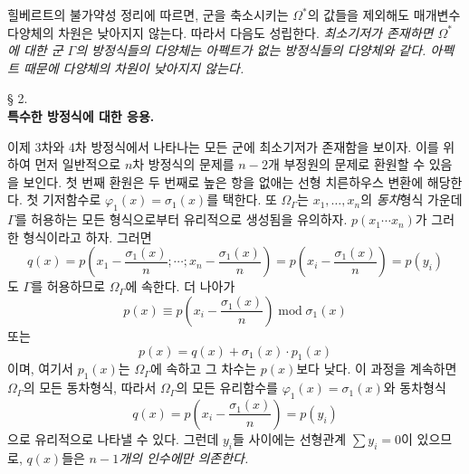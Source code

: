 힐베르트의 불가약성 정리에 따르면, 군을 축소시키는 \(\Omega^*\)의 값들을 제외해도 매개변수다양체의 차원은 낮아지지 않는다. 따라서 다음도 성립한다. \emph{최소기저가 존재하면 \(\Omega^*\)에 대한 군 \(\Gamma\)의 방정식들의 다양체는 아펙트가 없는 방정식들의 다양체와 같다. 아펙트 때문에 다양체의 차원이 낮아지지 않는다.}

\begin{center}
§ 2.\\[0.75em]
\textbf{특수한 방정식에 대한 응용.}
\end{center}

이제 3차와 4차 방정식에서 나타나는 모든 군에 최소기저가 존재함을 보이자. 이를 위하여 먼저 일반적으로 \(n\)차 방정식의 문제를 \(n-2\)개 부정원의 문제로 환원할 수 있음을 보인다. 첫 번째 환원은 두 번째로 높은 항을 없애는 선형 치른하우스 변환에 해당한다. 첫 기저함수로 \(\varphi_1(x)=\sigma_1(x)\)를 택한다. 또 \(\Omega_\Gamma\)는 \(x_1,\ldots,x_n\)의 \emph{동차}형식 가운데 \(\Gamma\)를 허용하는 모든 형식으로부터 유리적으로 생성됨을 유의하자. \(p(x_1\cdots x_n)\)가 그러한 형식이라고 하자. 그러면
\[
q(x)=p\left(x_1-\frac{\sigma_1(x)}{n};\cdots;x_n-\frac{\sigma_1(x)}{n}\right)=p\left(x_i-\frac{\sigma_1(x)}{n}\right)=p(y_i)
\]
도 \(\Gamma\)를 허용하므로 \(\Omega_\Gamma\)에 속한다. 더 나아가
\[
p(x)\equiv p\left(x_i-\frac{\sigma_1(x)}{n}\right)\operatorname{mod}\sigma_1(x)
\]
또는
\[
p(x)=q(x)+\sigma_1(x)\cdot p_1(x)
\]
이며, 여기서 \(p_1(x)\)는 \(\Omega_\Gamma\)에 속하고 그 차수는 \(p(x)\)보다 낮다. 이 과정을 계속하면 \(\Omega_\Gamma\)의 모든 동차형식, 따라서 \(\Omega_\Gamma\)의 모든 유리함수를 \(\varphi_1(x)=\sigma_1(x)\)와 동차형식
\[
q(x)=p\left(x_i-\frac{\sigma_1(x)}{n}\right)=p(y_i)
\]
으로 유리적으로 나타낼 수 있다. 그런데 \(y_i\)들 사이에는 선형관계 \(\sum y_i=0\)이 있으므로, \(q(x)\)들은 \emph{\(n-1\)개의 인수에만 의존한다.}

